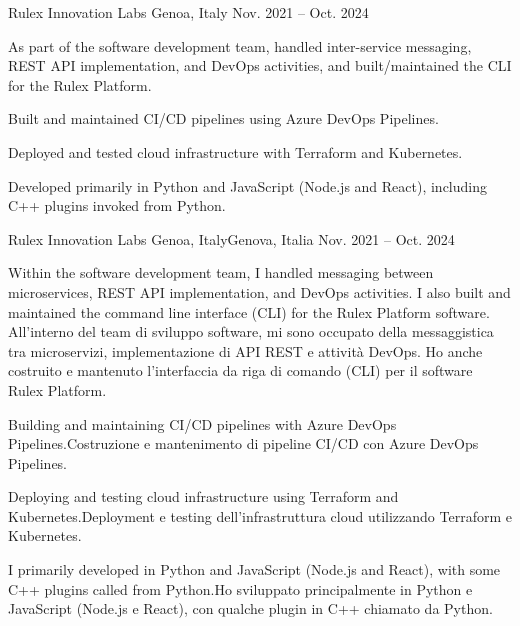\begin{cventries}
\ifenglish
{} %
{Rulex Innovation Labs} %
{Genoa, Italy} %
{Nov. 2021 -- Oct. 2024} %
{ %
\begin{cvitems}
  \item {As part of the software development team, handled inter-service messaging, REST API implementation, and DevOps activities, and built/maintained the CLI for the Rulex Platform.}
  \item {Built and maintained CI/CD pipelines using Azure DevOps Pipelines.}
  \item {Deployed and tested cloud infrastructure with Terraform and Kubernetes.}
  \item {Developed primarily in Python and JavaScript (Node.js and React), including C++ plugins invoked from Python.}
\end{cvitems}
}
\else
{} %
{Rulex Innovation Labs} %
{\ifenglish Genoa, Italy\else Genova, Italia\fi} %
{Nov. 2021 -- Oct. 2024} %
{ %
\begin{cvitems}
\item {\ifenglish 
    Within the software development team, I handled messaging between microservices, REST API implementation, and DevOps activities.
    I also built and maintained the command line interface (CLI) for the Rulex Platform software.
\else
    All'interno del team di sviluppo software, mi sono occupato della messaggistica tra microservizi, implementazione di API REST e attività DevOps.
    Ho anche costruito e mantenuto l'interfaccia da riga di comando (CLI) per il software Rulex Platform.
\fi}
\item {\ifenglish Building and maintaining CI/CD pipelines with Azure DevOps Pipelines.\else Costruzione e mantenimento di pipeline CI/CD con Azure DevOps Pipelines.\fi}
\item {\ifenglish Deploying and testing cloud infrastructure using Terraform and Kubernetes.\else Deployment e testing dell'infrastruttura cloud utilizzando Terraform e Kubernetes.\fi}
\item {\ifenglish I primarily developed in Python and JavaScript (Node.js and React), with some C++ plugins called from Python.\else Ho sviluppato principalmente in Python e JavaScript (Node.js e React), con qualche plugin in C++ chiamato da Python.\fi}
\end{cvitems}
}
\fi


\end{cventries}

